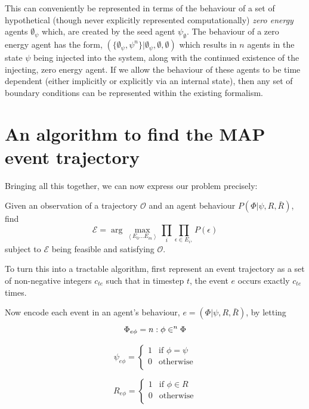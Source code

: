 \documentclass{article}
\begin{document}
This can conveniently be represented in terms of the behaviour of a set of hypothetical (though never explicitly represented computationally) \textit{zero energy} agents $\emptyset_\psi$ which, are created by the seed agent $\psi_\emptyset$. The behaviour of a zero energy agent has the form, $(\{\emptyset_\psi, \psi^n\}|\emptyset_\psi,\emptyset,\emptyset)$ which results in $n$ agents in the state $\psi$ being injected into the system, along with the continued existence of the injecting, zero energy agent. If we allow the behaviour of these agents to be time dependent (either implicitly or explicitly via an internal state), then any set of boundary conditions can be represented within the existing formalism.

\section{An algorithm to find the MAP event trajectory}

Bringing all this together, we can now express our problem precisely:

Given an observation of a trajectory $\mathcal{O}$ and an agent behaviour $P(\Phi|\psi,R,\bar{R})$, find
\begin{equation}
\mathcal{E} = \arg\max_{\left<E_0...E_m\right>}\prod_{i}\prod_{\epsilon\in E_i, }P(\epsilon)
\end{equation}
subject to $\mathcal{E}$ being feasible and satisfying $\mathcal{O}$.

To turn this into a tractable algorithm, first represent an event trajectory as a set of non-negative integers $c_{te}$ such that in timestep $t$, the event $e$ occurs exactly $c_{te}$ times.

Now encode each event in an agent's behaviour, $e = (\Phi|\psi,R,\bar{R})$, by letting 
\begin{equation}
\Phi_{e\phi} = n: \phi \in^n \Phi\\
\end{equation}

\begin{equation}
\psi_{e\phi} = 
\begin{cases}
1&\text{if } \phi = \psi\\
0&\text{otherwise}\\
\end{cases}
\end{equation}

\begin{equation}
R_{e\phi} =
\begin{cases}
1&\text{if } \phi \in R\\
0&\text{otherwise}\\
\end{cases}
\end{equation}
\end{document}
